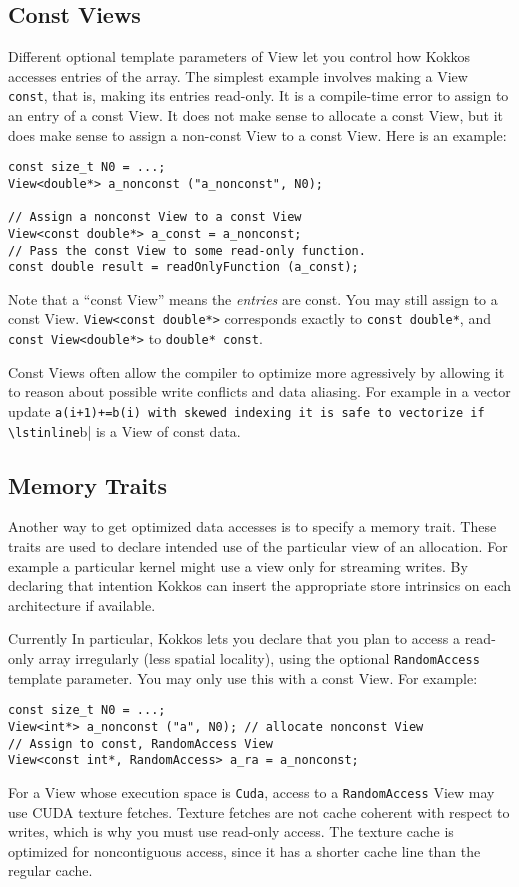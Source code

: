 \subsection{Const Views}

Different optional template parameters of View let you control how
Kokkos accesses entries of the array.  The simplest example involves
making a View \lstinline!const!, that is, making its entries read-only.  It
is a compile-time error to assign to an entry of a const View.  It
does not make sense to allocate a const View, but it does make sense
to assign a non-const View to a const View.  Here is an example:
\begin{lstlisting}
const size_t N0 = ...;
View<double*> a_nonconst ("a_nonconst", N0);

// Assign a nonconst View to a const View
View<const double*> a_const = a_nonconst;
// Pass the const View to some read-only function.
const double result = readOnlyFunction (a_const);
\end{lstlisting}
Note that a ``const View'' means the \emph{entries} are const.  You
may still assign to a const View.  \lstinline!View<const double*>!
corresponds exactly to \lstinline!const double*!, and
\lstinline!const View<double*>! to \lstinline!double* const!.

Const Views often allow the compiler to optimize more agressively by allowing it
to reason about possible write conflicts and data aliasing. For example in a vector
update \lstinline|a(i+1)+=b(i) with skewed indexing it is safe to vectorize if
\lstinline|b| is a View of const data.
  
\subsection{Memory Traits}

Another way to get optimized data accesses is to specify a memory trait. 
These traits are used to declare intended use of the particular view of 
an allocation. For example a particular kernel might use a view only for 
streaming writes. By declaring that intention Kokkos can insert the 
appropriate store intrinsics on each architecture if available. 

Currently 
In particular, Kokkos lets you declare that you plan
to access a read-only array irregularly (less spatial locality), using
the optional \lstinline!RandomAccess! template parameter.  You may only use
this with a const View.  For example:
\begin{lstlisting}
const size_t N0 = ...;
View<int*> a_nonconst ("a", N0); // allocate nonconst View
// Assign to const, RandomAccess View
View<const int*, RandomAccess> a_ra = a_nonconst;
\end{lstlisting}
For a View whose execution space is \lstinline!Cuda!, access to a
\lstinline!RandomAccess! View may use CUDA texture fetches.  Texture
fetches are not cache coherent with respect to writes, which is why
you must use read-only access.  The texture cache is optimized for
noncontiguous access, since it has a shorter cache line than the
regular cache.

